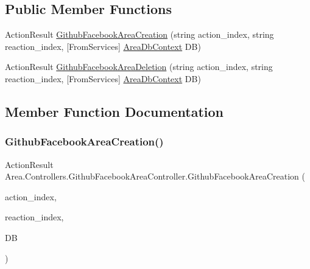 \subsection*{Public Member Functions}
\begin{DoxyCompactItemize}
\item 
Action\+Result \mbox{\hyperlink{classArea_1_1Controllers_1_1GithubFacebookAreaController_a77c51d433cb771e27be9db12ab7dc16f}{Github\+Facebook\+Area\+Creation}} (string action\+\_\+index, string reaction\+\_\+index, \mbox{[}From\+Services\mbox{]} \mbox{\hyperlink{classArea_1_1DAT_1_1AreaDbContext}{Area\+Db\+Context}} DB)
\item 
Action\+Result \mbox{\hyperlink{classArea_1_1Controllers_1_1GithubFacebookAreaController_a8611f6f02f968f08b14a1888a84900b7}{Github\+Facebook\+Area\+Deletion}} (string action\+\_\+index, string reaction\+\_\+index, \mbox{[}From\+Services\mbox{]} \mbox{\hyperlink{classArea_1_1DAT_1_1AreaDbContext}{Area\+Db\+Context}} DB)
\end{DoxyCompactItemize}


\subsection{Member Function Documentation}
\mbox{\label{classArea_1_1Controllers_1_1GithubFacebookAreaController_a77c51d433cb771e27be9db12ab7dc16f}} 
\subsubsection{\texorpdfstring{Github\+Facebook\+Area\+Creation()}{GithubFacebookAreaCreation()}}
{\footnotesize\ttfamily Action\+Result Area.\+Controllers.\+Github\+Facebook\+Area\+Controller.\+Github\+Facebook\+Area\+Creation (\begin{DoxyParamCaption}\item[{string}]{action\+\_\+index,  }\item[{string}]{reaction\+\_\+index,  }\item[{\mbox{[}\+From\+Services\mbox{]} \mbox{\hyperlink{classArea_1_1DAT_1_1AreaDbContext}{Area\+Db\+Context}}}]{DB }\end{DoxyParamCaption})\hspace{0.3cm}{\ttfamily [inline]}}

